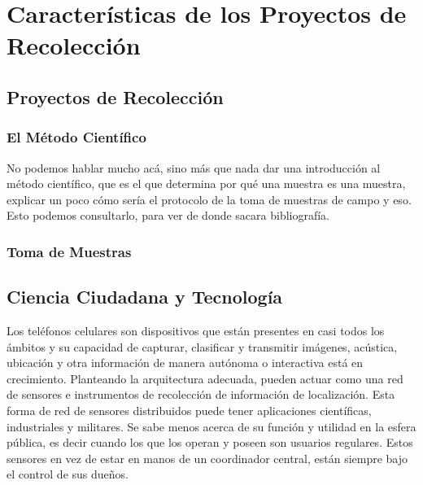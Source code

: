 \chapter{Características de los Proyectos de Recolección}

\section{Proyectos de Recolección}

	

\subsection{El Método Científico}
No podemos hablar mucho acá, sino más que nada dar una introducción al método científico, que es el que determina por qué una muestra es una muestra, explicar un poco cómo sería el protocolo de la toma de muestras de campo y eso. Esto podemos consultarlo, para ver de donde sacara bibliografía.

\subsection{Toma de Muestras}


	


\section{Ciencia Ciudadana y Tecnología}

	Los teléfonos celulares son dispositivos que están presentes en casi todos los ámbitos y su capacidad de capturar, clasificar y transmitir imágenes, acústica, ubicación y otra información de manera autónoma o interactiva está en crecimiento.
Planteando la arquitectura adecuada, pueden actuar como una red de sensores e instrumentos de recolección de información de localización. 
Esta forma de red de sensores distribuidos puede tener aplicaciones científicas, industriales y militares. Se sabe menos acerca de su función y utilidad en la esfera pública, es decir cuando los que los operan y poseen son usuarios regulares.   Estos sensores en vez de estar en manos de un coordinador central, están siempre bajo el control de sus dueños.

